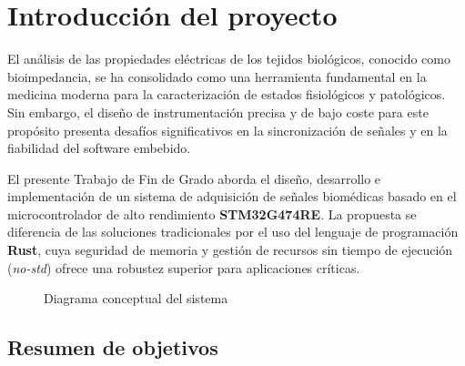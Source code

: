 \documentclass[11pt,a4paper]{article}
\begin{document}
\section{Introducción del proyecto}

El análisis de las propiedades eléctricas de los tejidos biológicos, conocido como bioimpedancia, se ha consolidado como una herramienta fundamental en la medicina moderna para la caracterización de estados fisiológicos y patológicos. Sin embargo, el diseño de instrumentación precisa y de bajo coste para este propósito presenta desafíos significativos en la sincronización de señales y en la fiabilidad del software embebido.

El presente Trabajo de Fin de Grado aborda el diseño, desarrollo e implementación de un sistema de adquisición de señales biomédicas basado en el microcontrolador de alto rendimiento \textbf{STM32G474RE}. La propuesta se diferencia de las soluciones tradicionales por el uso del lenguaje de programación \textbf{Rust}, cuya seguridad de memoria y gestión de recursos sin tiempo de ejecución (\textit{no-std}) ofrece una robustez superior para aplicaciones críticas.

\begin{figure}[H]
\centering
{}
\caption{Diagrama conceptual del sistema}
\end{figure}


\subsection{Resumen de objetivos}
\end{document}
